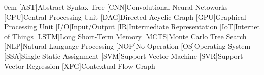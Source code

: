 \begin{acronym}[LSTM]\itemsep0em
    [AST]{Abstract Syntax Tree}
    [CNN]{Convolutional Neural Netoworks}
    [CPU]{Central Processing Unit}
    [DAG]{Directed Acyclic Graph}
    [GPU]{Graphical Processing Unit}
    [I/O]{Input/Output}
    [IR]{Intermediate Representation}
    [IoT]{Internet of Things}
    [LSTM]{Long Short-Term Memory}
    [MCTS]{Monte Carlo Tree Search}
    [NLP]{Natural Language Processing}
    [NOP]{No-Operation}
    [OS]{Operating System}
    [SSA]{Single Static Assignment}
    [SVM]{Support Vector Machine}
    [SVR]{Support Vector Regression}
    [XFG]{Contextual Flow Graph}
\end{acronym}
